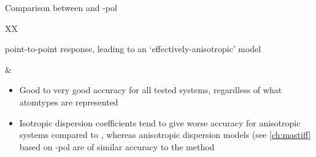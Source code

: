 \begin{subsubsection}{Comparison between \idma and \isa-pol}
\begin{table}
\begin{tabu}{XX}
\begin{itemize}[topsep=0pt]
point-to-point response, leading to an `effectively-anisotropic' model
\end{itemize}
& 
\begin{itemize}[topsep=0pt]
\item Good to very good accuracy for all tested systems, regardless of what
atomtypes are represented
\item Isotropic dispersion coefficients tend to give worse accuracy for
anisotropic systems compared to \idma, whereas anisotropic dispersion models
(see \cref{ch:mastiff} based on \isa-pol are of similar accuracy to the \idma
method
\end{itemize}
\\ %
\bottomrule
\end{tabu}
\caption{Comparison between the \idma and \isa-pol methods.}
\label{tab:workflow-dispersion_comparison}
\end{table}

\end{subsubsection}
